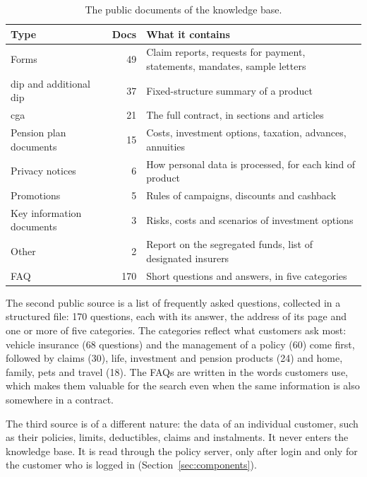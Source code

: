 \begin{table}[H]
  \centering
  \small
  \renewcommand\arraystretch{1.25}
  \begin{tabularx}{\textwidth}{@{}L{4.2cm}rY@{}}
    \toprule
    \textbf{Type} & \textbf{Docs} & \textbf{What it contains} \\
    \midrule
    Forms & 49 & Claim reports, requests for payment, statements, mandates, sample letters \\
    \acs{dip} and additional \acs{dip} & 37 & Fixed-structure summary of a product \\
    \acs{cga} & 21 & The full contract, in sections and articles \\
    Pension plan documents & 15 & Costs, investment options, taxation, advances, annuities \\
    Privacy notices & 6 & How personal data is processed, for each kind of product \\
    Promotions & 5 & Rules of campaigns, discounts and cashback \\
    Key information documents & 3 & Risks, costs and scenarios of investment options \\
    Other & 2 & Report on the segregated funds, list of designated insurers \\
    \midrule
    FAQ & 170 & Short questions and answers, in five categories \\
    \bottomrule
  \end{tabularx}
  \caption{The public documents of the knowledge base.}
  \label{tab:document-types}
\end{table}

The second public source is a list of frequently asked questions, collected in a structured
file: 170 questions, each with its answer, the address of its page and one or more of
five categories. The categories reflect what customers ask most: vehicle insurance (68 questions)
and the management of a policy (60) come first, followed by claims (30), life, investment and
pension products (24) and home, family, pets and travel (18). The FAQs are written in the words
customers use, which makes them valuable for the search even when the same information is also
somewhere in a contract.

The third source is of a different nature: the data of an individual customer, such as their
policies, limits, deductibles, claims and instalments. It never enters the knowledge base. It is
read through the policy server, only after login and only for the customer who is logged in
(Section~\ref{sec:components}).

